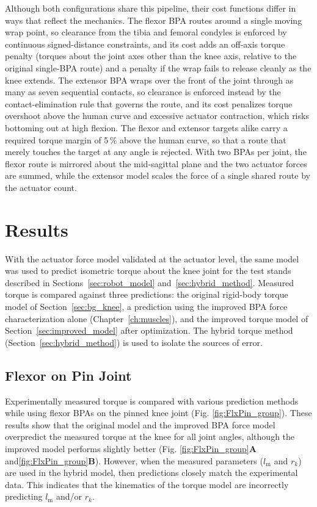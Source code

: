 Although both configurations share this pipeline, their cost functions differ in ways that reflect the mechanics. The flexor BPA routes around a single moving wrap point, so clearance from the tibia and femoral condyles is enforced by continuous signed-distance constraints, and its cost adds an off-axis torque penalty (torques about the joint axes other than the knee axis, relative to the original single-BPA route) and a penalty if the wrap fails to release cleanly as the knee extends. The extensor BPA wraps over the front of the joint through as many as seven sequential contacts, so clearance is enforced instead by the contact-elimination rule that governs the route, and its cost penalizes torque overshoot above the human curve and excessive actuator contraction, which risks bottoming out at high flexion. The flexor and extensor targets alike carry a required torque margin of 5\,\% above the human curve, so that a route that merely touches the target at any angle is rejected. With two BPAs per joint, the flexor route is mirrored about the mid-sagittal plane and the two actuator forces are summed, while the extensor model scales the force of a single shared route by the actuator count.

\section{Results}\label{sec:results_torque}

With the actuator force model validated at the actuator level, the same model was used to predict isometric torque about the knee joint for the test stands described in Sections~\ref{sec:robot_model} and~\ref{sec:hybrid_method}. Measured torque is compared against three predictions: the original rigid-body torque model of Section~\ref{sec:bg_knee}, a prediction using the improved BPA force characterization alone (Chapter~\ref{ch:muscles}), and the improved torque model of Section~\ref{sec:improved_model} after optimization. The hybrid torque method (Section~\ref{sec:hybrid_method}) is used to isolate the sources of error.

\subsection{Flexor on Pin Joint}

Experimentally measured torque is compared with various prediction methods while using flexor BPAs on the pinned knee joint (Fig. \ref{fig:FlxPin_group}). These results show that the original model and the improved BPA force model overpredict the measured torque at the knee for all joint angles, although the improved model performs slightly better (Fig. \ref{fig:FlxPin_group}\textbf{A} and\ref{fig:FlxPin_group}\textbf{B}). However, when the measured parameters ($l_\text{m}$ and $r_{k}$) are used in the hybrid model, then predictions closely match the experimental data. This indicates that the kinematics of the torque model are incorrectly predicting $l_\text{m}$ and/or $r_{k}$. 

